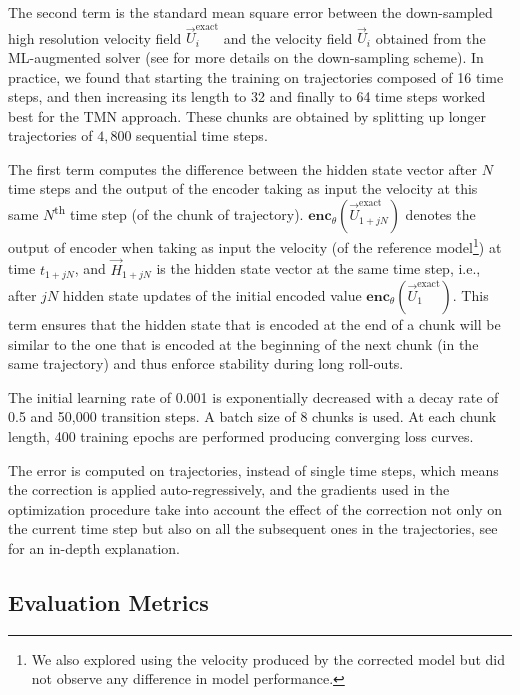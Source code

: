 \noindent
The second term is the standard mean square error between the down-sampled high resolution velocity field $\vec{U}_i^{\text{exact}}$ and the velocity field $\vec{U}_i$ obtained from the ML-augmented solver (see \citeauthor{kochkov2021machine} for more details on the down-sampling scheme). In practice, we found that starting the training on trajectories composed of 16 time steps, and then increasing its length to 32 and finally to 64 time steps worked best for the TMN approach. These chunks are obtained by splitting up longer trajectories of $4,800$ sequential time steps. 

The first term computes the difference between the hidden state vector after $N$ time steps and the output of the encoder taking as input the velocity at this same $N$\textsuperscript{th} time step (of the chunk of trajectory). $\textbf{enc}_{\theta}(\vec{U}_{1 + jN}^{\text{exact}})$ denotes the output of encoder when taking as input the velocity (of the reference model\footnote{We also explored using the velocity produced by the corrected model but did not observe any difference in model performance.}) at time $t_{1 + jN}$, and $\vec{H}_{1 + jN}$ is the hidden state vector at the same time step, i.e., after $jN$ hidden state updates of the initial encoded value $\textbf{enc}_{\theta}(\vec{U}_{1}^{\text{exact}})$. This term ensures that the hidden state that is encoded at the end of a chunk will be similar to the one that is encoded at the beginning of the next chunk (in the same trajectory) and thus enforce stability during long roll-outs.

The initial learning rate of 0.001 is exponentially decreased with a decay rate of 0.5 and 50,000 transition steps. A batch size of 8 chunks is used. At each chunk length, 400 training epochs are performed producing converging loss curves. 

The error is computed on trajectories, instead of single time steps, which means the correction is applied auto-regressively, and the gradients used in the optimization procedure take into account the effect of the correction not only on the current time step but also on all the subsequent ones in the trajectories, see \citeauthor{melchers2023comparison} for an in-depth explanation. 
\subsection{Evaluation Metrics}
\label{subsec:metric}

